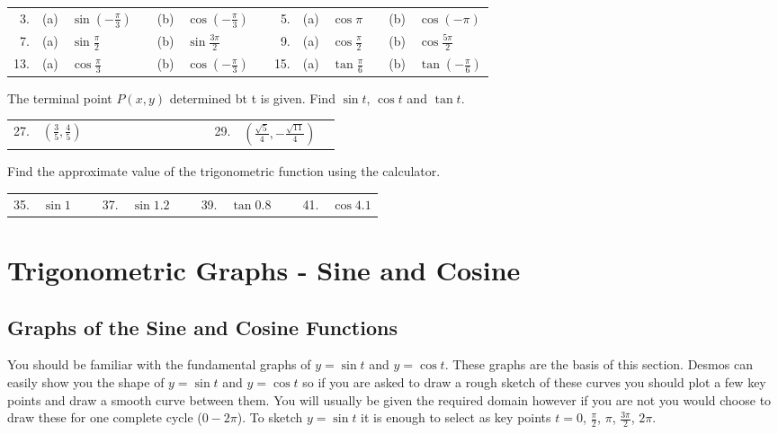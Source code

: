 \begin{tabular}[c]{rllllllrlllll}3.\vspace*{0.25cm}
	& (a)  & $\sin  \left ( -\frac{\pi }{3}\right )$  &  & (b)  & $\cos  \left ( -\frac{\pi }{3}\right )$  &  & 5.  & (a)
	& $\cos  \pi $  &  & (b)  & $\cos  \left ( -\pi \right )$  \\
	7.\vspace*{0.25cm}  & (a)
	& $\sin  \frac{\pi }{2}$  &  & (b)  & $\sin  \frac{3 \pi }{2}$  &  & 9.  & (a)
	& $\cos  \frac{\pi }{2}$  &  & (b)  & $\cos  \frac{5 \pi }{2}$  \\
	13.\vspace*{0.25cm}  & (a)
	& $\cos  \frac{\pi }{3}$  &  & (b)  & $\cos  \left ( -\frac{\pi }{3}\right )$  &  & 15.  & (a)
	& $\tan  \frac{\pi }{6}$  &  & (b)  & $\tan  \left ( -\frac{\pi }{6}\right )$
\end{tabular}

The terminal point $P (x ,y)$ determined bt t is given. Find $\sin  t$, $\cos  t$ and $\tan  t\text{.}$ 


\begin{tabular}[c]{lllllllllll}27.  & $\left (\frac{3}{5} ,\frac{4}{5}\right )$  &  \  \  \  \  \  \  \  &  &  &  &  &  & 29.
	& $\left (\frac{\sqrt{5}}{4} , -\frac{\sqrt{11}}{4}\right )$  & 
\end{tabular}

Find the approximate value of the trigonometric function using the calculator. 

\begin{tabular}[c]{lllllllllll}35.  & $\sin  1$  &  \   & 37.
	& $\sin  1.2$  &  \   & 39.
	& $\tan  0.8$  &  \   & 41.
	& $\cos  4.1$
\end{tabular}



\section{Trigonometric Graphs - Sine and Cosine}

\subsection{Graphs of the Sine and Cosine Functions}
You should be familiar with the fundamental graphs of $y =\sin  t$ and $y =\cos  t$. These graphs are the basis of this section. Desmos
can easily show you the shape of $y =\sin  t$ and $y =\cos  t$ so if you are asked to draw a rough sketch of these curves you should plot a few key points and draw a smooth curve between them. You
will usually be given the required domain however if you are not you would choose to draw these for one complete cycle ($0 -2 \pi $). To sketch $y =\sin  t$ it is enough to select as key points $t =0$, $\frac{\pi }{2}$, $\pi $, $\frac{3 \pi }{2}$, $2 \pi $. 


